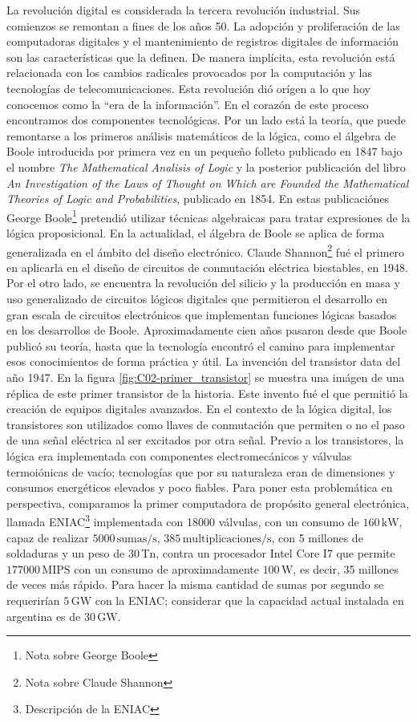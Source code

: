 La revolución digital es considerada la tercera revolución industrial. Sus comienzos se remontan a fines de los años 50. La adopción y proliferación de las computadoras digitales y el mantenimiento de registros digitales de información son las características que la definen. De manera implícita, esta revolución está relacionada con los cambios radicales provocados por la computación y las tecnologías de telecomunicaciones. Esta revolución dió orígen a lo que hoy conocemos como la ``era de la información''. En el corazón de este proceso encontramos dos componentes tecnológicas. Por un lado está la teoría, que puede remontarse a los primeros análisis matemáticos de la lógica, como el álgebra de Boole introducida por primera vez en un pequeño folleto publicado en 1847 bajo el nombre \emph{The Mathematical Analisis of Logic} y la posterior publicación del libro \emph{An Investigation of the Laws of Thought on Which are Founded the Mathematical Theories of Logic and Probabilities}, publicado en 1854. En estas publicaciónes George Boole\footnote{Nota sobre George Boole} pretendió utilizar técnicas algebraicas para tratar expresiones de la lógica proposicional. En la actualidad, el álgebra de Boole se aplica de forma generalizada en el ámbito del diseño electrónico. Claude Shannon\footnote{Nota sobre Claude Shannon} fué el primero en aplicarla en el diseño de circuitos de conmutación eléctrica biestables, en 1948. Por el otro lado, se encuentra la revolución del silicio y la producción en masa y uso generalizado de circuitos lógicos digitales que permitieron el desarrollo en gran escala de circuitos electrónicos que implementan funciones lógicas basados en los desarrollos de Boole. Aproximadamente cien años pasaron desde que Boole publicó su teoría, hasta que la tecnología encontró el camino para implementar esos conocimientos de forma práctica y útil. La invención del transistor data del año 1947. En la figura \ref{fig:C02-primer_transistor} se muestra una imágen de una réplica de este primer transistor de la historia. Este invento fué el que permitió la creación de equipos digitales avanzados. En el contexto de la lógica digital, los transistores son utilizados como llaves de conmutación que permiten o no el paso de una señal eléctrica al ser excitados por otra señal. Previo a los transistores, la lógica era implementada con componentes electromecánicos y válvulas termoiónicas de vacío; tecnologías que por su naturaleza eran de dimensiones y consumos energéticos elevados y poco fiables. Para poner esta problemática en perspectiva, comparamos la primer computadora de propósito general electrónica, llamada ENIAC\footnote{Descripción de la ENIAC} implementada con 18000 válvulas, con un consumo de $160\,\mathrm{kW}$, capaz de realizar $5000\,\mathrm{sumas/s}$, $385\,\mathrm{multiplicaciones/s}$, con 5 millones de soldaduras y un peso de $30\,\mathrm{Tn}$, contra un procesador Intel Core I7 que permite $177000\,\mathrm{MIPS}$ con un consumo de aproximadamente $100\,\mathrm{W}$, es decir, 35 millones de veces más rápido. Para hacer la misma cantidad de sumas por segundo se requerirían $5\,\mathrm{GW}$ con la ENIAC; considerar que la capacidad actual instalada en argentina es de $30\,\mathrm{GW}$.
